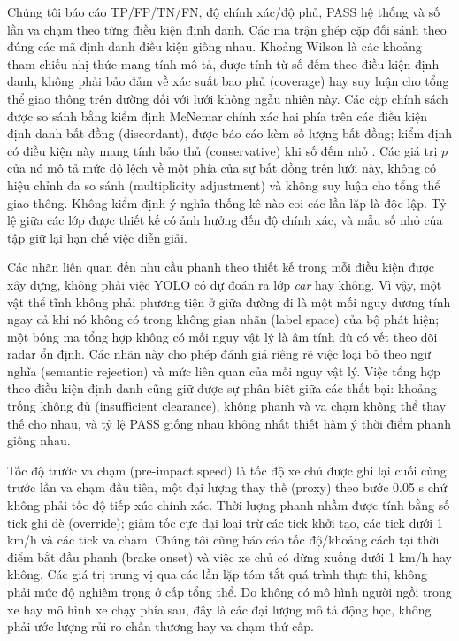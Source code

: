 \documentclass[11pt,a4paper]{article}
\begin{document}
Chúng tôi báo cáo TP/FP/TN/FN, độ chính xác/độ phủ, PASS hệ thống và số lần
va chạm theo từng điều kiện định danh. Các ma trận ghép cặp đối sánh theo đúng
các mã định danh điều kiện giống nhau. Khoảng Wilson \cite{wilson1927} là các
khoảng tham chiếu nhị thức mang tính mô tả, được tính từ số đếm theo điều kiện
định danh, không phải bảo đảm về xác suất bao phủ (coverage) hay suy luận cho
tổng thể giao thông trên đường đối với lưới không ngẫu nhiên này. Các cặp
chính sách được so sánh bằng kiểm định McNemar chính xác hai phía
\cite{mcnemar1947} trên các điều kiện định danh bất đồng (discordant), được
báo cáo kèm số lượng bất đồng; kiểm định có điều kiện này mang tính bảo thủ
(conservative) khi số đếm nhỏ \cite{fagerland2013mcnemar}. Các giá trị $p$ của
nó mô tả mức độ lệch về một phía của sự bất đồng trên lưới này, không có hiệu
chỉnh đa so sánh (multiplicity adjustment) và không suy luận cho tổng thể giao
thông. Không kiểm định ý nghĩa thống kê nào coi các lần lặp là độc lập. Tỷ lệ
giữa các lớp được thiết kế có ảnh hưởng đến độ chính xác, và mẫu số nhỏ của
tập giữ lại hạn chế việc diễn giải.

Các nhãn liên quan đến nhu cầu phanh theo thiết kế trong mỗi điều kiện được
xây dựng, không phải việc YOLO có dự đoán ra lớp \emph{car} hay không. Vì vậy,
một vật thể tĩnh không phải phương tiện ở giữa đường đi là một mối nguy dương
tính ngay cả khi nó không có trong không gian nhãn (label space) của bộ phát
hiện; một bóng ma tổng hợp không có mối nguy vật lý là âm tính dù có vết theo
dõi radar ổn định. Các nhãn này cho phép đánh giá riêng rẽ việc loại bỏ theo
ngữ nghĩa (semantic rejection) và mức liên quan của mối nguy vật lý. Việc tổng
hợp theo điều kiện định danh cũng giữ được sự phân biệt giữa các thất bại:
khoảng trống không đủ (insufficient clearance), không phanh và va chạm không
thể thay thế cho nhau, và tỷ lệ PASS giống nhau không nhất thiết hàm ý thời
điểm phanh giống nhau.

Tốc độ trước va chạm (pre-impact speed) là tốc độ xe chủ được ghi lại cuối
cùng trước lần va chạm đầu tiên, một đại lượng thay thế (proxy) theo bước
0.05 s chứ không phải tốc độ tiếp xúc chính xác. Thời lượng phanh nhầm được
tính bằng số tick ghi đè (override); giảm tốc cực đại loại trừ các tick khởi
tạo, các tick dưới 1 km/h và các tick va chạm. Chúng tôi cũng báo cáo tốc
độ/khoảng cách tại thời điểm bắt đầu phanh (brake onset) và việc xe chủ có dừng xuống dưới
1 km/h hay không. Các giá trị trung vị qua các lần lặp tóm tắt quá trình thực
thi, không phải mức độ nghiêm trọng ở cấp tổng thể. Do không có mô hình người
ngồi trong xe hay mô hình xe chạy phía sau, đây là các đại lượng mô tả động
học, không phải ước lượng rủi ro chấn thương hay va chạm thứ cấp.
\end{document}
